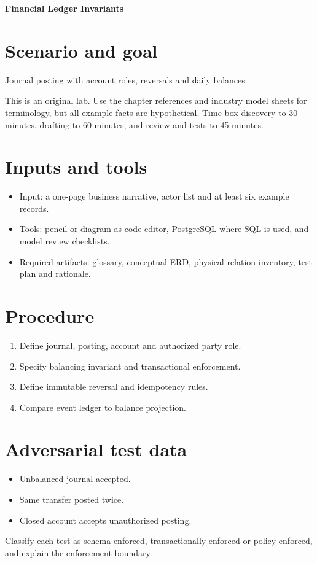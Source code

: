 \documentclass[11pt,letterpaper]{article}
\begin{document}
\begin{center}
{\LARGE\bfseries\color{navy} Financial Ledger Invariants}\par
\vspace{0.25em}{\large Practical modeling laboratory}\par
{}
\end{center}
\vspace{0.8em}
\section{Scenario and goal}
Journal posting with account roles, reversals and daily balances

This is an original lab. Use the chapter references and industry model sheets for terminology, but all example facts are hypothetical. Time-box discovery to 30 minutes, drafting to 60 minutes, and review and tests to 45 minutes.


\section{Inputs and tools}
\begin{itemize}
\item Input: a one-page business narrative, actor list and at least six example records.
\item Tools: pencil or diagram-as-code editor, PostgreSQL where SQL is used, and model review checklists.
\item Required artifacts: glossary, conceptual ERD, physical relation inventory, test plan and rationale.
\end{itemize}

\section{Procedure}
\begin{enumerate}
\item Define journal, posting, account and authorized party role.
\item Specify balancing invariant and transactional enforcement.
\item Define immutable reversal and idempotency rules.
\item Compare event ledger to balance projection.
\end{enumerate}

\section{Adversarial test data}
\begin{itemize}
\item Unbalanced journal accepted.
\item Same transfer posted twice.
\item Closed account accepts unauthorized posting.
\end{itemize}
Classify each test as schema-enforced, transactionally enforced or policy-enforced, and explain the enforcement boundary.
\end{document}
